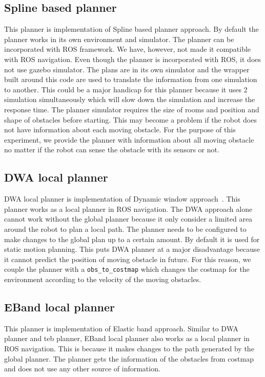 \subsection{Spline based planner}%
\label{sub:spline_based_planner}
This planner\cite{omgtools} is implementation of Spline based planner approach\cite{mercy2017spline}.
By default the planner works in its own environment and simulator. The planner can be 
incorporated with ROS framework\cite{p3dxMotionplanner}. We have, however, not made it 
compatible with ROS navigation.
Even though the planner is incorporated with ROS, it does not use gazebo simulator. The 
plans are in its own simulator and the wrapper built around this code are used to translate the 
information from one simulation to another. This could be a major handicap for this planner 
because it uses 2 simulation simultaneously which will slow down the simulation and increase
the response time.
The planner simulator requires the size of rooms and position and shape of obstacles before
starting. This may become a problem if the robot does not have information about each moving
obstacle. For the purpose of this experiment, we provide the planner with information about
all moving obstacle no matter if the robot can sense the obstacle with its sensors or not.

\subsection{DWA local planner}%
\label{sub:dynamic_window_approach_planner}
DWA local planner\cite{dwa} is implementation of Dynamic window approach~\cite{fox1997dynamic}.
This planner works as a local planner in ROS navigation\cite{rosnavigation}. The DWA approach
alone cannot work without the global planner because it only consider a limited area around
the robot to plan a local path. The planner needs to be configured to make changes to the
global plan up to a certain amount.
By default it is used for static motion planning. This puts DWA planner at a major disadvantage
because it cannot predict the position of moving obstacle in future. 
For this reason, we couple the planner with a \texttt{obs\_to\_costmap} which changes the costmap for the 
environment according to the velocity of the moving obstacles. 

\subsection{EBand local planner}%
\label{sub:eband_local_planner}
This planner\cite{eband} is implementation of Elastic band approach\cite{quinlan1993elastic}.
Similar to DWA planner and teb planner, EBand local planner also works as a local planner
in ROS navigation\cite{rosnavigation}. This is because it makes changes to the path generated
by the global planner. 
The planner gets the information of the obstacles from costmap and does not use any other 
source of information.

